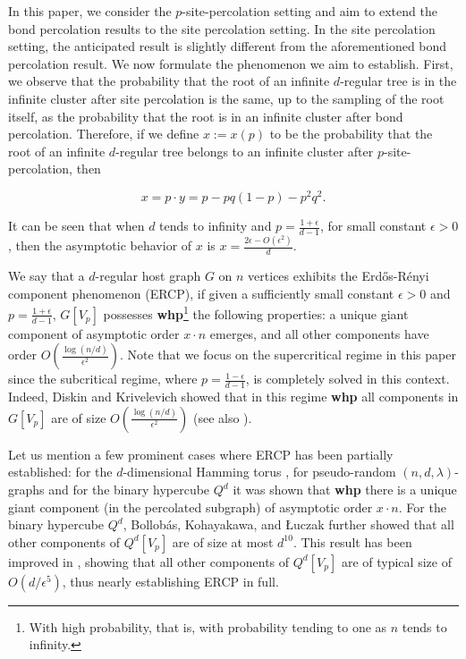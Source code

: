\documentclass[notitlepage]{scrartcl}
\begin{document}
In this paper, we consider the $p$-site-percolation setting and aim to extend the bond percolation results to the site percolation setting. In the site percolation setting, the anticipated result is slightly different from the aforementioned bond percolation result. We now formulate the phenomenon we aim to establish.
First, we observe that the probability that the root of an infinite $d$-regular tree is in the infinite cluster after site percolation is the same, up to the sampling of the root itself, as the probability that the root is in an infinite cluster after bond percolation.
Therefore, if we define $x:=x(p)$ to be the probability that the root of an infinite $d$-regular tree belongs to an infinite cluster after $p$-site-percolation, then

\begin{equation} \label{eq}
    x=p\cdot y=p-pq(1-p)-p^2q^2.
\end{equation}

It can be seen that when $d$ tends to infinity and $p=\frac{1+\epsilon}{d-1}$, for small constant $\epsilon>0$, then the asymptotic behavior of $x$ is $x=\frac{2\epsilon-O\left(\epsilon^2\right)}{d}$.

We say that a $d$-regular host graph $G$ on $n$ vertices exhibits the Erd\H os-R\'{e}nyi component phenomenon (ERCP), if given a sufficiently small constant $\epsilon>0$ and $p=\frac{1+\epsilon}{d-1}$, $G[V_p]$ possesses \textbf{whp}\footnote{With high probability, that is, with probability tending to one as $n$ tends to infinity.} the following properties: a unique giant component of asymptotic order $x\cdot n$ emerges, and all other components have order $O\left(\frac{\log (n/d)}{\epsilon^2}\right)$. Note that we focus on the supercritical regime in this paper since the subcritical regime, where $p=\frac{1-\epsilon}{d-1}$, is completely solved in this context. Indeed, Diskin and Krivelevich \cite{zbMATH07751060} showed that in this regime \textbf{whp} all components in $G[V_p]$ are of size $O\left(\frac{\log (n/d)}{\epsilon^2}\right)$ (see also \cite{zbMATH06534995}).

Let us mention a few prominent cases where ERCP has been partially established: for the $d$-dimensional Hamming torus \cite{zbMATH06285647}, for pseudo-random $(n,d,\lambda)$-graphs \cite{zbMATH07751060,zbMATH06534995} and for the binary hypercube $Q^d$ \cite{zbMATH00736289} it was shown that \textbf{whp} there is a unique giant component (in the percolated subgraph) of asymptotic order $x\cdot n$. For the binary hypercube $Q^d$, Bollob\'as, Kohayakawa, and \L uczak \cite{zbMATH00736289} further showed that all other components of $Q^d[V_p]$ are of size at most $d^{10}$. This result has been improved in \cite{zbMATH07770097}, showing that all other components of $Q^d[V_p]$ are of typical size of $O\left(d/\epsilon^5\right)$, thus nearly establishing ERCP in full.
\end{document}
